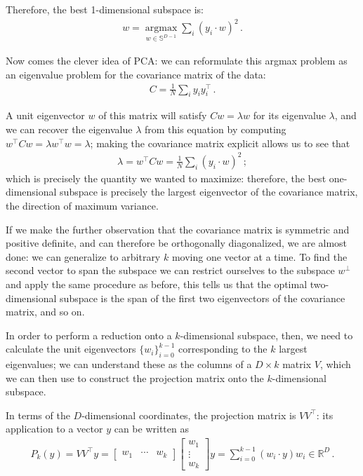 \documentclass[main.tex]{subfiles}
\begin{document}
Therefore, the best 1-dimensional subspace is: %
%
\begin{align}
w = \underset{w \in \mathbb{S}^{D-1}}{\operatorname{argmax}} \sum _{i} (y_i \cdot w)^2
\,.
\end{align}
%

Now comes the clever idea of \ac{PCA}: we can reformulate this argmax problem as an eigenvalue problem for the covariance matrix of the data: 
%
\begin{align}
C = \frac{1}{N} \sum _{i} y_i y_i^{\top}
\,.
\end{align}

A unit eigenvector \(w\) of this matrix will satisfy \(Cw = \lambda w\) for its eigenvalue \(\lambda \), and we can recover the eigenvalue \(\lambda\) from this equation by computing \(w^{\top} C w = \lambda w^{\top} w = \lambda \); making the covariance matrix explicit allows us to see that 
%
\begin{align}
\lambda = w^{\top} C w =  \frac{1}{N }\sum _{i} (y_i \cdot w)^2
\,;
\end{align}
%
which is precisely the quantity we wanted to maximize: therefore, the best one-dimensional subspace is precisely the largest eigenvector of the covariance matrix, the direction of maximum variance. 

If we make the further observation that the covariance matrix is symmetric and positive definite, and can therefore be orthogonally diagonalized, we are almost done: we can generalize to arbitrary \(k\) moving one vector at a time. 
To find the second vector to span the subspace we can restrict ourselves to the subspace \(w^{\perp}\) and apply the same procedure as before, this tells us that the optimal two-dimensional subspace is the span of the first two eigenvectors of the covariance matrix, and so on. 

In order to perform a reduction onto a \(k\)-dimensional subspace, then, we need to calculate the unit eigenvectors \(\{ w_i\}_{i=0}^{k-1}\) corresponding to the \(k\) largest eigenvalues;
we can understand these as the columns of a \(D \times k\) matrix \(V\), which we can then use to construct the projection matrix onto the \(k\)-dimensional subspace.

In terms of the \(D\)-dimensional coordinates, the projection matrix is \(V V^{\top}\): its application to a vector \(y\) can be written as 
%
\begin{subequations}
\begin{align}
P_k (y) = V V^{\top} y = \left[\begin{array}{ccc}
w_1  & \cdots & w_k
\end{array}\right] 
\left[\begin{array}{c}
w_1  \\ 
\vdots \\ 
w_k
\end{array}\right]
y 
= \sum _{i=0}^{k-1}
(w_i \cdot y) w_i \in \mathbb{R}^{D}
\,.
\end{align}
\end{subequations}
\end{document}

